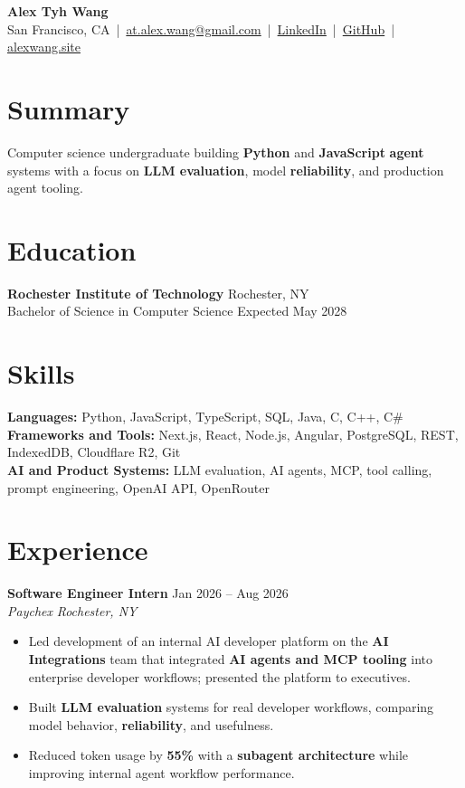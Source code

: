 \documentclass[10pt,letterpaper]{article}
\newif\ifresumeFirstRole
\newcommand{\resumeRole}[4]{%
  \ifresumeFirstRole
    \global\resumeFirstRolefalse
  \else
    \vspace{0pt plus 1fill}%
  \fi
  \textbf{#1} \hfill #2\\
  \textit{#3} \hfill \textit{#4}
}
\begin{document}
\begin{center}
{\Large \textbf{Alex Tyh Wang}}\\
San Francisco, CA \,|\, \href{mailto:at.alex.wang@gmail.com}{at.alex.wang@gmail.com} \,|\, \href{https://www.linkedin.com/in/alex-tyh-wang/}{LinkedIn} \,|\, \href{https://github.com/alextyhwang}{GitHub} \,|\, \href{https://alexwang.site}{alexwang.site}
\end{center}

\section*{Summary}
Computer science undergraduate building \textbf{Python} and \textbf{JavaScript} \textbf{agent} systems with a focus on \textbf{LLM evaluation}, model \textbf{reliability}, and production agent tooling.

\section*{Education}
\textbf{Rochester Institute of Technology} \hfill Rochester, NY\\
Bachelor of Science in Computer Science \hfill Expected May 2028

\section*{Skills}
\textbf{Languages:} Python, JavaScript, TypeScript, SQL, Java, C, C++, C\#\\
\textbf{Frameworks and Tools:} Next.js, React, Node.js, Angular, PostgreSQL, REST, IndexedDB, Cloudflare R2, Git\\
\textbf{AI and Product Systems:} LLM evaluation, AI agents, MCP, tool calling, prompt engineering, OpenAI API, OpenRouter

\section*{Experience}

\resumeRole{Software Engineer Intern}{Jan 2026 -- Aug 2026}{Paychex}{Rochester, NY}
\begin{itemize}
  \item Led development of an internal AI developer platform on the \textbf{AI Integrations} team that integrated \textbf{AI agents and MCP tooling} into enterprise developer workflows; presented the platform to executives.
  \item Built \textbf{LLM evaluation} systems for real developer workflows, comparing model behavior, \textbf{reliability}, and usefulness.
  \item Reduced token usage by \textbf{55\%} with a \textbf{subagent architecture} while improving internal agent workflow performance.
\end{itemize}
\end{document}

